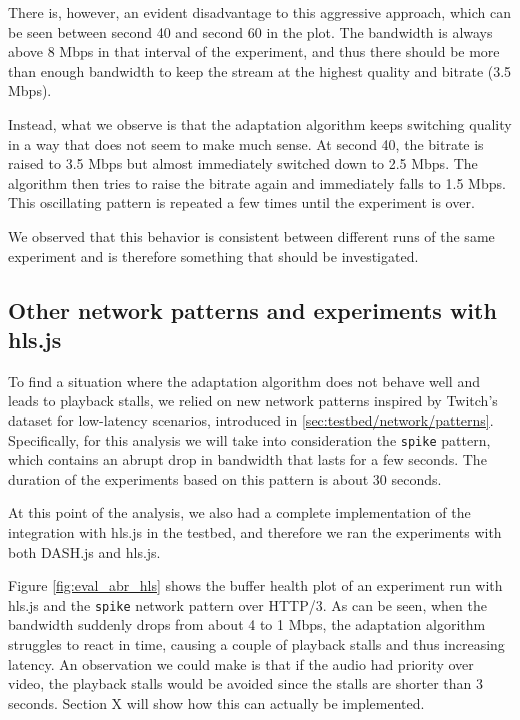 There is, however, an evident disadvantage to this aggressive approach, which can be seen between second 40 and second 60 in the plot. The bandwidth is always above 8 Mbps in that interval of the experiment, and thus there should be more than enough bandwidth to keep the stream at the highest quality and bitrate (3.5 Mbps).

Instead, what we observe is that the adaptation algorithm keeps switching quality in a way that does not seem to make much sense. At second 40, the bitrate is raised to 3.5 Mbps but almost immediately switched down to 2.5 Mbps. The algorithm then tries to raise the bitrate again and immediately falls to 1.5 Mbps. This oscillating pattern is repeated a few times until the experiment is over.

We observed that this behavior is consistent between different runs of the same experiment and is therefore something that should be investigated.

\subsection{Other network patterns and experiments with hls.js}
\label{sec:eval/abr/hls}

To find a situation where the adaptation algorithm does not behave well and leads to playback stalls, we relied on new network patterns inspired by Twitch's dataset for low-latency scenarios, introduced in \ref{sec:testbed/network/patterns}. Specifically, for this analysis we will take into consideration the \texttt{spike} pattern, which contains an abrupt drop in bandwidth that lasts for a few seconds. The duration of the experiments based on this pattern is about 30 seconds.

At this point of the analysis, we also had a complete implementation of the integration with hls.js in the testbed, and therefore we ran the experiments with both DASH.js and hls.js.

Figure \ref{fig:eval_abr_hls} shows the buffer health plot of an experiment run with hls.js and the \texttt{spike} network pattern over HTTP/3. As can be seen, when the bandwidth suddenly drops from about 4 to 1 Mbps, the adaptation algorithm struggles to react in time, causing a couple of playback stalls and thus increasing latency. An observation we could make is that if the audio had priority over video, the playback stalls would be avoided since the stalls are shorter than 3 seconds. Section X will show how this can actually be implemented.

